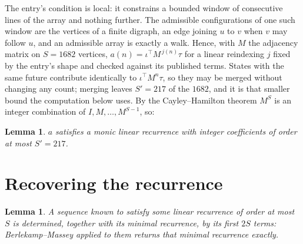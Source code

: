 \documentclass[11pt,a4paper]{article}
\theoremstyle{plain}
\newtheorem{lemma}[theorem]{Lemma}
\theoremstyle{definition}
\begin{document}
The entry's condition is local: it constrains a bounded window of consecutive lines of the
array and nothing further. The admissible configurations of one such window are the vertices
of a finite digraph, an edge joining $u$ to $v$ when $v$ may follow $u$, and an admissible
array is exactly a walk. Hence, with $M$ the adjacency matrix on $S=1682$ vertices,
$a(n)=\iota^{\!\top}M^{\,j(n)}\tau$ for a linear reindexing $j$ fixed by the entry's shape
and checked against its published terms. States with the same future contribute identically to $\iota^{\!\top}M^n\tau$, so they may be merged without changing any count; merging leaves $S'=217$ of the $1682$, and it is that smaller bound the computation below uses. By the Cayley--Hamilton theorem $M^{S}$ is an
integer combination of $I,M,\dots,M^{S-1}$, so:

\begin{lemma}\label{lem:cf}
$a$ satisfies a monic linear recurrence with integer coefficients of order at most
$S'=217$.
\end{lemma}

\section{Recovering the recurrence}

\begin{lemma}\label{lem:bm}
A sequence known to satisfy some linear recurrence of order at most $S$ is determined, together
with its minimal recurrence, by its first $2S$ terms: Berlekamp--Massey applied to them returns
that minimal recurrence exactly.
\end{lemma}
\end{document}
